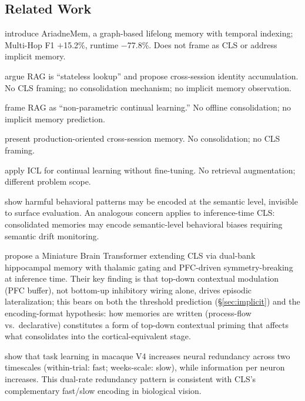 \documentclass[11pt]{article}
\begin{document}
\subsection*{Related Work}

\textbf{\citet{zhu2026ariadnemem}} introduce AriadneMem, a graph-based
lifelong memory with temporal indexing; Multi-Hop F1 $+$15.2\%,
runtime $-$77.8\%. Does not frame as CLS or address implicit memory.

\textbf{\citet{logan2026continuum}} argue RAG is ``stateless lookup''
and propose cross-session identity accumulation. No CLS framing; no
consolidation mechanism; no implicit memory observation.

\textbf{\citet{gutierrez2025hipporag2}} frame RAG as ``non-parametric
continual learning.'' No offline consolidation; no implicit memory
prediction.

\textbf{\citet{chhikara2025mem0}} present production-oriented
cross-session memory. No consolidation; no CLS framing.

\textbf{\citet{kang2025iclcl}} apply ICL for continual learning without
fine-tuning. No retrieval augmentation; different problem scope.

\textbf{\citet{saxena2026semantic}} show harmful behavioral patterns
may be encoded at the semantic level, invisible to surface evaluation.
An analogous concern applies to inference-time CLS: consolidated
memories may encode semantic-level behavioral biases requiring
semantic drift monitoring.

\textbf{\citet{jafari2026mbt}} propose a Miniature Brain Transformer
extending CLS via dual-bank hippocampal memory with thalamic gating
and PFC-driven symmetry-breaking at inference time. Their key finding
is that top-down contextual modulation (PFC buffer), not bottom-up
inhibitory wiring alone, drives episodic lateralization; this bears on
both the threshold prediction (\S\ref{sec:implicit}) and the
encoding-format hypothesis: how memories are
written (process-flow vs.\ declarative) constitutes a form of
top-down contextual priming that affects what consolidates into the
cortical-equivalent stage.

\textbf{\citet{liu2026redundancy}} show that task learning in macaque V4
increases neural redundancy across two timescales (within-trial: fast;
weeks-scale: slow), while information per neuron increases. This
dual-rate redundancy pattern is consistent with CLS's complementary
fast/slow encoding in biological vision.

\end{document}
